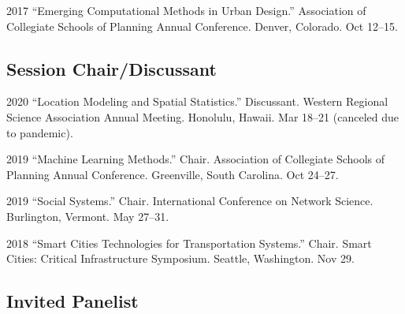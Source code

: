 \documentclass[12pt,letterpaper]{report}
\begin{document}
    \begin{tablist}

        \item[2017] \tab \enquote{Emerging Computational Methods in Urban Design.} Association of Collegiate Schools of Planning Annual Conference. Denver, Colorado. Oct 12--15.

    \end{tablist}

    \subsection*{Session Chair/Discussant}

    \begin{tablist}

        \item[2020] \tab \enquote{Location Modeling and Spatial Statistics.} Discussant. Western Regional Science Association Annual Meeting. Honolulu, Hawaii. Mar 18--21 (canceled due to pandemic).

        \item[2019] \tab \enquote{Machine Learning Methods.} Chair. Association of Collegiate Schools of Planning Annual Conference. Greenville, South Carolina. Oct 24--27.

        \item[2019] \tab \enquote{Social Systems.} Chair. International Conference on Network Science. Burlington, Vermont. May 27--31.

        \item[2018] \tab \enquote{Smart Cities Technologies for Transportation Systems.} Chair. Smart Cities: Critical Infrastructure Symposium. Seattle, Washington. Nov 29.

    \end{tablist}

    \subsection*{Invited Panelist}
\end{document}

